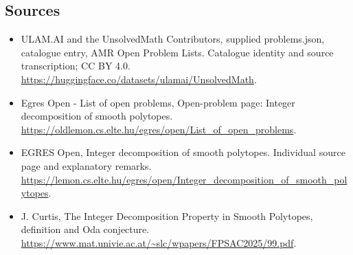 \documentclass[11pt,a4paper]{article}
\begin{document}
\subsection{Sources}
\begin{itemize}
\item[S1] ULAM.AI and the UnsolvedMath Contributors, supplied problems.json, catalogue entry, AMR Open Problem Lists. Catalogue identity and source transcription; CC BY 4.0.
\url{https://huggingface.co/datasets/ulamai/UnsolvedMath}.
\item[S2] Egres Open - List of open problems, Open-problem page: Integer decomposition of smooth polytopes. 
\url{https://oldlemon.cs.elte.hu/egres/open/List_of_open_problems}.
\item[S3] EGRES Open, Integer decomposition of smooth polytopes. Individual source page and explanatory remarks.
\url{https://lemon.cs.elte.hu/egres/open/Integer_decomposition_of_smooth_polytopes}.
\item[S4] J. Curtis, The Integer Decomposition Property in Smooth Polytopes, definition and Oda conjecture.
\url{https://www.mat.univie.ac.at/~slc/wpapers/FPSAC2025/99.pdf}.
\end{itemize}
\end{document}
